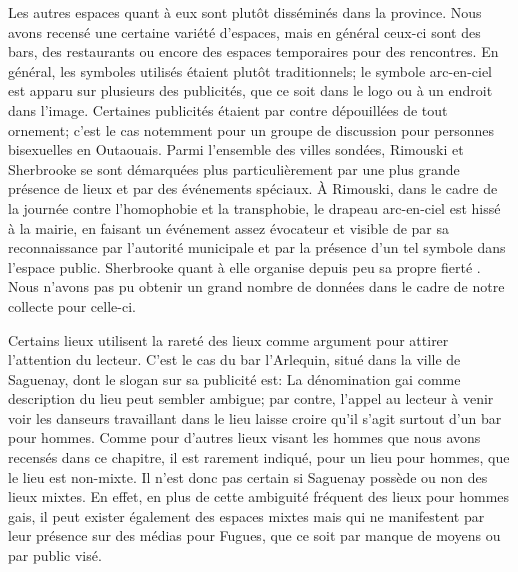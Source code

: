 Les autres espaces quant à eux sont plutôt disséminés dans la province.
Nous avons recensé une certaine variété d'espaces, mais en général ceux-ci sont des bars, des restaurants ou encore des espaces temporaires pour des rencontres.
En général, les symboles utilisés étaient plutôt traditionnels; le symbole arc-en-ciel est apparu sur plusieurs des publicités, que ce soit dans le logo ou à un endroit dans l'image.
Certaines publicités étaient par contre dépouillées de tout ornement; c'est le cas notemment pour un groupe de discussion pour personnes bisexuelles en Outaouais.
Parmi l'ensemble des villes sondées, Rimouski et Sherbrooke se sont démarquées plus particulièrement par une plus grande présence de lieux et par des événements spéciaux.
À Rimouski, dans le cadre de la journée contre l'homophobie et la transphobie, le drapeau arc-en-ciel est hissé à la mairie, en faisant un événement assez évocateur et visible de par sa reconnaissance par l'autorité municipale et par la présence d'un tel symbole dans l'espace public.
Sherbrooke quant à elle organise depuis peu sa propre fierté \lgbt{}.
Nous n'avons pas pu obtenir un grand nombre de données dans le cadre de notre collecte pour celle-ci.

Certains lieux utilisent la rareté des lieux \lgbt{} comme argument pour attirer l'attention du lecteur.
C'est le cas du bar l'Arlequin, situé dans la ville de Saguenay, dont le slogan sur sa publicité est: 
La dénomination gai comme description du lieu peut sembler ambigue; par contre, l'appel au lecteur à venir voir les danseurs travaillant dans le lieu laisse croire qu'il s'agit surtout d'un bar pour hommes.
Comme pour d'autres lieux visant les hommes que nous avons recensés dans ce chapitre, il est rarement indiqué, pour un lieu pour hommes, que le lieu est non-mixte.
Il n'est donc pas certain si Saguenay possède ou non des lieux mixtes.
En effet, en plus de cette ambiguité fréquent des lieux pour hommes gais, il peut exister également des espaces mixtes mais qui ne manifestent par leur présence sur des médias pour Fugues, que ce soit par manque de moyens ou par public visé.

